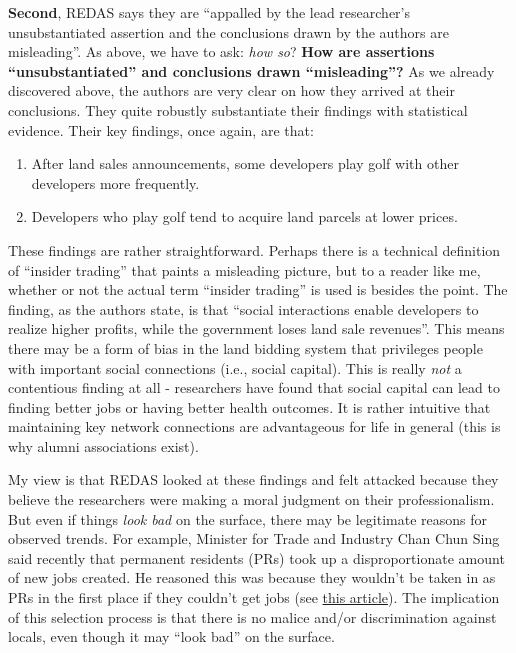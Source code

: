 \documentclass[openany]{book}
\providecommand{\tightlist}{%
  \setlength{\itemsep}{0pt}\setlength{\parskip}{0pt}}
\begin{document}
\textbf{Second}, REDAS says they are ``appalled by the lead researcher's
unsubstantiated assertion and the conclusions drawn by the authors are
misleading''. As above, we have to ask: \emph{how so}? \textbf{How are
assertions ``unsubstantiated'' and conclusions drawn ``misleading''?} As
we already discovered above, the authors are very clear on how they
arrived at their conclusions. They quite robustly substantiate their
findings with statistical evidence. Their key findings, once again, are
that:

\begin{enumerate}
\def\labelenumi{\arabic{enumi}.}
\tightlist
\item
  After land sales announcements, some developers play golf with other
  developers more frequently.
\item
  Developers who play golf tend to acquire land parcels at lower prices.
\end{enumerate}

These findings are rather straightforward. Perhaps there is a technical
definition of ``insider trading'' that paints a misleading picture, but
to a reader like me, whether or not the actual term ``insider trading''
is used is besides the point. The finding, as the authors state, is that
``social interactions enable developers to realize higher profits, while
the government loses land sale revenues''. This means there may be a
form of bias in the land bidding system that privileges people with
important social connections (i.e., social capital). This is really
\emph{not} a contentious finding at all - researchers have found that
social capital can lead to finding better jobs or having better health
outcomes. It is rather intuitive that maintaining key network
connections are advantageous for life in general (this is why alumni
associations exist).

My view is that REDAS looked at these findings and felt attacked because
they believe the researchers were making a moral judgment on their
professionalism. But even if things \emph{look bad} on the surface,
there may be legitimate reasons for observed trends. For example,
Minister for Trade and Industry Chan Chun Sing said recently that
permanent residents (PRs) took up a disproportionate amount of new jobs
created. He reasoned this was because they wouldn't be taken in as PRs
in the first place if they couldn't get jobs (see
\href{https://www.todayonline.com/singapore/prs-took-about-17-net-new-jobs-created-spore-between-2015-and-2018-chan-chun-sing}{this
article}). The implication of this selection process is that there is no
malice and/or discrimination against locals, even though it may ``look
bad'' on the surface.
\end{document}
